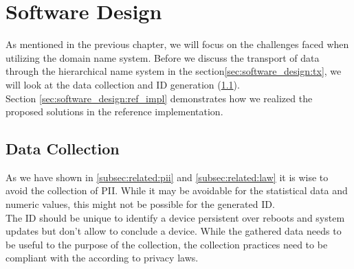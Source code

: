 \chapter{Software Design}
\label{chap:software_design}

As mentioned in the previous chapter, we will focus on the challenges faced when utilizing the domain name system. Before we discuss the transport of data through the hierarchical name system in the section\ref{sec:software_design:tx}, we will look at the data collection and ID generation (\ref{sec:software_design:data_collection}).\\
Section \ref{sec:software_design:ref_impl} demonstrates how we realized the proposed solutions in the reference implementation.


%



\section{Data Collection}
\label{sec:software_design:data_collection}
    As we have shown in \ref{subsec:related:pii} and \ref{subsec:related:law} it is wise to avoid the collection of PII. While it may be avoidable for the statistical data and numeric values, this might not be possible for the generated ID.\\
    The ID should be unique to identify a device persistent over reboots and system updates but don't allow to conclude a device.
    While the gathered data needs to be useful to the purpose of the collection, the collection practices need to be compliant with the according to privacy laws. 
    
